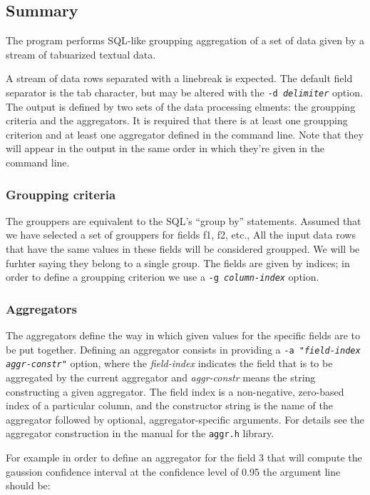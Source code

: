 \documentclass{report}
\begin{document}
\subsection{Summary}
The program performs SQL-like groupping aggregation of a set of data given by a
stream of tabuarized textual data.

A stream of data rows separated with a linebreak is expected. The default
field separator is the tab character, but may be altered with the
\texttt{-d \textit{delimiter}} option. The output is defined by two sets
of the data processing elments: the groupping criteria and the aggregators.
It is required that there is at least one groupping criterion and at least one
aggregator defined in the command line. Note that they will appear in the output
in the same order in which they're given in the command line.

\subsubsection{Groupping criteria}
The grouppers are equivalent to the SQL's ``group by'' statements.
Assumed that we have selected a set of grouppers for fields f1, f2, etc.,
All the input data rows that have the same values in these fields will be
considered groupped. We will be furhter saying they belong to a single group.
The fields are given by indices; in order to define a groupping criterion we use
a \texttt{-g \textit{column-index}} option.

\subsubsection{Aggregators}
The aggregators define the way in which given values for the specific fields
are to be put together. Defining an aggregator consists in providing a
\texttt{-a "\textit{field-index} \textit{aggr-constr}"} option, where the
\textit{field-index} indicates the field that is to be aggregated by the
current aggregator and \textit{aggr-constr} means the string constructing
a given aggregator. The field index is a non-negative, zero-based index
of a particular column, and the constructor string is the name of the
aggregator followed by optional, aggregator-specific arguments. For details see
the aggregator construction in the manual for the \texttt{aggr.h} library.

For example in order to define an aggregator for the field 3 that will compute
the gaussion confidence interval at the confidence level of 0.95 the argument
line should be:
\end{document}
